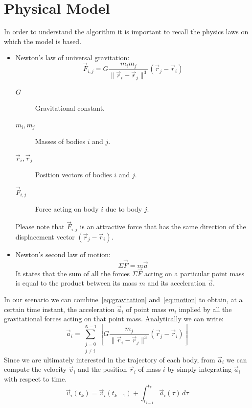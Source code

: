 \documentclass{article}
\begin{document}
\section{Physical Model}
In order to understand the algorithm it is important to recall the physics laws on which the model is based.
\begin{itemize}
\item Newton's law of universal gravitation:
\begin{equation}
\vec{F}_{i,j}=G\frac{m_{i} m_{j}}{\|\vec{r}_{i}-\vec{r}_{j}\|^3}(\vec{r}_{j}-\vec{r}_{i})
\label{eq:gravitation}
\end{equation}
\begin{description}
    \item[\( G \)] Gravitational constant.
    \item[\( m_i, m_j \)] Masses of bodies \( i \) and \( j \).
    \item[\( \vec{r}_i, \vec{r}_j \)] Position vectors of bodies \( i \) and \( j \).
    \item[\( \vec{F}_{i,j} \)] Force acting on body \( i \) due to body \( j \).
\end{description}
Please note that $\vec{F}_{i,j}$ is an attractive force that has the same direction of the displacement vector \mbox{$(\vec{r}_j - \vec{r}_i)$}.
\item Newton's second law of motion:
\begin{equation}
\Sigma\vec{F} = m\vec{a}
\label{eq:motion}
\end{equation}
It states that the sum of all the forces $\Sigma\vec{F}$ acting on a particular point mass is equal to the product between its mass $m$ and its acceleration $\vec{a}$.
\end{itemize}
In our scenario we can combine~\eqref{eq:gravitation} and~\eqref{eq:motion} to obtain, at a certain time instant, the acceleration $\vec{a}_i$ of point mass $m_i$ implied by all the gravitational forces acting on that point mass. Analytically we can write:
\begin{equation}
\vec{a}_i=\sum_{\substack{j=0 \\ j \neq i}}^{N-1}\left[G\frac{m_j}{\|\vec{r}_i-\vec{r}_j\|^3}(\vec{r}_j-\vec{r}_i)\right]
\label{eq:acceleration}
\end{equation}
Since we are ultimately interested in the trajectory of each body, from $\vec{a}_i$ we can compute the velocity $\vec{v}_i$ and the position $\vec{r}_i$ of mass $i$ by simply integrating $\vec{a}_i$ with respect to time.
\begin{equation}
\vec{v}_i(t_k) = \vec{v}_i(t_{k-1}) + \int_{t_{k-1}}^{t_k} \vec{a}_i(\tau)\, d\tau
\label{eq:continuous_v}
\end{equation}
\end{document}
